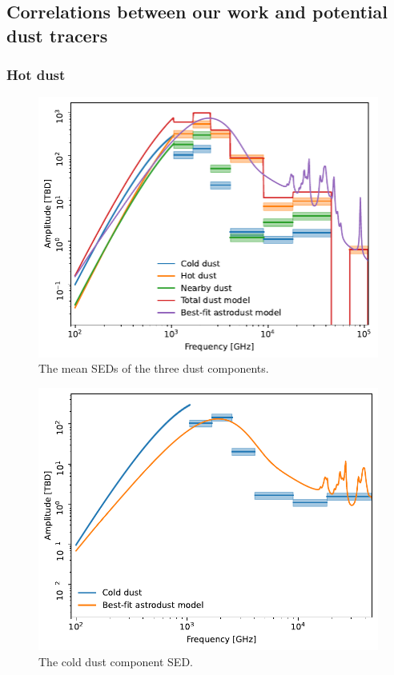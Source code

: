 \documentclass{aa}
\begin{document}
\subsection{Correlations between our work and potential dust tracers}
\subsubsection{Hot dust}


\begin{figure}
  \centering
  \includegraphics[width=\columnwidth]{figures/all_components_sed.pdf}
  \caption{The mean SEDs of the three dust components.}
  \label{fig:all_components_sed}
\end{figure}
\begin{figure}
  \centering
  \includegraphics[width=\columnwidth]{figures/cold_dust_sed.pdf}
  \caption{The cold dust component SED.}
  \label{fig:cold_dust_sed}
\end{figure}
\end{document}
